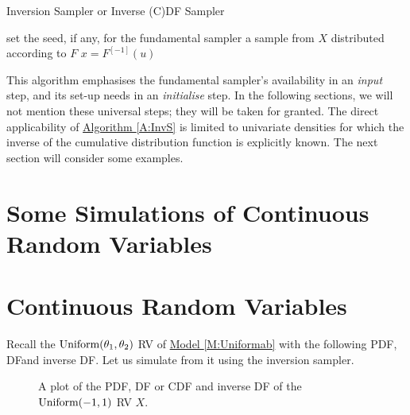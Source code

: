 \begin{algorithm}
\caption{Inversion Sampler or Inverse (C)DF Sampler}
\label{A:InvS}
\begin{algorithmic}[1]
 set the seed, if any, for the fundamental sampler
 a sample from $X$ distributed according to $F$
 $x = F^{[-1]}(u)$
\end{algorithmic}
\end{algorithm}
This algorithm emphasises the fundamental sampler's availability in an {\it input} step, and its set-up needs in an {\it initialise} step.  In the following sections, we will not mention these universal steps; they will be taken for granted.  The direct applicability of \hyperref[A:InvS]{Algorithm \ref*{A:InvS}} is limited to univariate densities for which the inverse of the cumulative distribution function is explicitly known.  The next section will consider some examples.

\section{Some Simulations of Continuous Random Variables}\label{S:InvSContinuousRVs}
\section{Continuous Random Variables}

Recall the $\mbox{{\rm Uniform}}(\theta_1,\theta_2)$ RV of \hyperref[M:Uniformab]{Model \ref*{M:Uniformab}} with the following PDF, DFand inverse DF. Let us simulate from it using the inversion sampler.

\begin{figure}[htpb]
\caption{A plot of the PDF, DF or CDF and inverse DF of the $\mbox{{\rm Uniform}}(-1,1)$ RV $X$.\label{F:unifpm1}}
\centering   {}
\end{figure}

